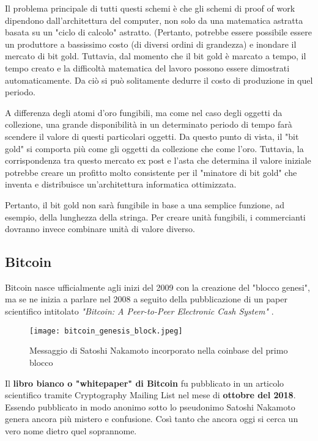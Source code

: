 Il problema principale di tutti questi schemi è che gli schemi di proof of work dipendono dall'architettura del computer, non solo da una matematica astratta basata su un "ciclo di calcolo" astratto. (Pertanto, potrebbe essere possibile essere un produttore a bassissimo costo (di diversi ordini di grandezza) e inondare il mercato di bit gold. Tuttavia, dal momento che il bit gold è marcato a tempo, il tempo creato e la difficoltà matematica del lavoro possono essere dimostrati automaticamente. Da ciò si può solitamente dedurre il costo di produzione in quel periodo.

A differenza degli atomi d'oro fungibili, ma come nel caso degli oggetti da collezione, una grande disponibilità in un determinato periodo di tempo farà scendere il valore di questi particolari oggetti. Da questo punto di vista, il "bit gold" si comporta più come gli oggetti da collezione che come l'oro. Tuttavia, la corrispondenza tra questo mercato ex post e l'asta che determina il valore iniziale potrebbe creare un profitto molto consistente per il "minatore di bit gold" che inventa e distribuisce un'architettura informatica ottimizzata.

Pertanto, il bit gold non sarà fungibile in base a una semplice funzione, ad esempio, della lunghezza della stringa. Per creare unità fungibili, i commercianti dovranno invece combinare unità di valore diverso.

\subsection{Bitcoin}
Bitcoin nasce ufficialmente agli inizi del 2009 con la creazione del "blocco genesi", ma se ne inizia a parlare nel 2008 a seguito della pubblicazione di un paper scientifico intitolato \textit{"Bitcoin: A Peer-to-Peer Electronic Cash System"} \cite{bitcoin-white-paper}.

\begin{figure}[h]
  \centering
  \texttt{[image: bitcoin\_genesis\_block.jpeg]}
  \caption{Messaggio di Satoshi Nakamoto incorporato nella coinbase del primo blocco}
  \label{fig:bitcoin_genesis_block}
\end{figure}

Il \textbf{libro bianco o "whitepaper" di Bitcoin} fu pubblicato in un articolo scientifico tramite Cryptography Mailing List nel mese di \textbf{ottobre del 2018}. Essendo pubblicato in modo anonimo sotto lo pseudonimo Satoshi Nakamoto genera ancora più mistero e confusione. Così tanto che ancora oggi si cerca un vero nome dietro quel soprannome.

